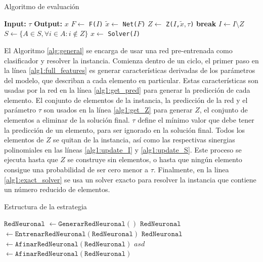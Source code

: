 \documentclass[spanish, a4paper, 12pt, openany,final]{book}
\begin{document}
 \begin{algorithm}[H]
	\caption{Algoritmo de evaluación}\label{alg:general}
	\begin{algorithmic}[1]
		\Statex \textbf{Input:} $\tau$
		\Statex \textbf{Output:} $x$
		\Loop
		\State $F \gets$ \texttt{F($I$)}\label{alg1:full_features}
		\State $\tilde{x} \gets$ \texttt{Net($F$)} \label{alg1:get_pred}
		\State $Z \gets$ \texttt{Z($I$,$\tilde{x},\tau$)} \label{alg1:get_Z}
		 \label{alg1:break_condition}
		\State \textbf{break}
		\EndIf
		\State $I \gets I\setminus Z$ 								\label{alg1:update_I}
		\State $S \gets \{A \in S, \forall i \in A: i \notin Z\}$  \label{alg1:update_S}
		\EndLoop
		\State $x \gets$ \texttt{Solver($I$)} \label{alg1:exact_solver} 
	\end{algorithmic}
\end{algorithm}



El Algoritmo \ref{alg:general} se encarga de usar una red pre-entrenada como clasificador y resolver la instancia. Comienza dentro de un ciclo, el primer paso en la línea \ref{alg1:full_features} es generar características derivadas de los parámetros del modelo, que describan a cada elemento en particular. Estas características son usadas por la red en la línea \ref{alg1:get_pred} para generar la predicción de cada elemento. El conjunto de elementos de la instancia, la predicción de la red y el parámetro $\tau$ son usados en la línea \ref{alg1:get_Z} para generar $Z$, el conjunto de elementos a eliminar de la solución final. $\tau$ define el mínimo valor que debe tener la predicción de un elemento, para ser ignorado en la solución final. Todos los elementos de $Z$ se quitan de la instancia, así como las respectivas sinergias polinomiales en las líneas \ref{alg1:update_I} y \ref{alg1:update_S}. Este proceso se ejecuta hasta que $Z$ se construye sin elementos, o hasta que ningún elemento consigue una probabilidad de ser cero menor a $\tau$. Finalmente, en la linea \ref{alg1:exact_solver} se usa un solver exacto para resolver la instancia que contiene un número reducido de elementos.

\begin{algorithm}[H]
	\caption{Estructura de la estrategia}\label{alg:prep}
	\begin{algorithmic}[1]
		\State $\texttt{RedNeuronal}$ $\gets \mathtt{GenerarRedNeuronal()}$
		\State $\texttt{RedNeuronal}$ $\gets \mathtt{EntrenarRedNeuronal(RedNeuronal)}$
		\State $\texttt{RedNeuronal}$ $\gets \mathtt{AfinarRedNeuronal(RedNeuronal)}$
			\State $asd$
		\EndFor
		\State $\texttt{}$ $\gets \mathtt{AfinarRedNeuronal(RedNeuronal)}$
				
		
	\end{algorithmic}
\end{algorithm}
\end{document}
